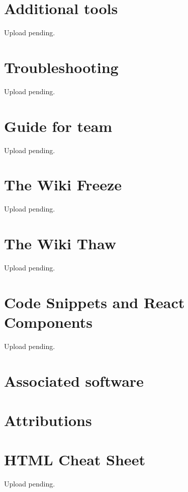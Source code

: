 \documentclass[a4paper, 11pt, twoside]{book}
\begin{document}
\chapter{Additional tools} \label{ch:addtools}
Upload pending. %
%
\newpage
%
\chapter{Troubleshooting} \label{ch:troubleshooting}
Upload pending. %
%
\newpage
%
\chapter{Guide for team} \label{ch:guide}
Upload pending. %
%
\newpage
%
\chapter{The Wiki Freeze}  \label{ch:freeze}
Upload pending. %
%
\newpage
%
\chapter{The Wiki Thaw} \label{ch:thaw}
Upload pending. %
%
\newpage
%
\chapter{Code Snippets and React Components} \label{ch:appendix}
Upload pending. %
%
\newpage

\backmatter
{}
\pagecolor{pgcolor}

\chapter{Associated software} \label{ch:associated-software}


\chapter{Attributions} \label{ch:attributions}

%
\chapter{HTML Cheat Sheet} \label{ch:htmlcheatsheet}
Upload pending. %
%
\newpage
\end{document}
